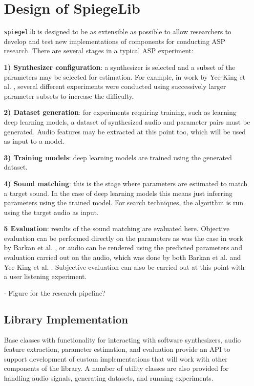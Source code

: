  
\section{Design of SpiegeLib}
\label{chapter:inverse_synth;section:spiegelib}

\texttt{spiegelib} is designed to be as extensible as possible to allow researchers to develop and test new implementations of components for conducting ASP research. There are several stages in a typical ASP experiment:

\textbf{1) Synthesizer configuration}: a synthesizer is selected and a subset of the parameters may be selected for estimation. For example, in work by Yee-King et al. \cite{yee2018automatic}, several different experiments were conducted using successively larger parameter subsets to increase the difficulty.

\textbf{2) Dataset generation}: for experiments requiring training, such as learning deep learning models, a dataset of synthesized audio and parameter pairs must be generated. Audio features may be extracted at this point too, which will be used as input to a model.

\textbf{3) Training models}: deep learning models are trained using the generated dataset.

\textbf{4) Sound matching}: this is the stage where parameters are estimated to match a target sound. In the case of deep learning models this means just inferring parameters using the trained model. For search techniques, the algorithm is run using the target audio as input.

\textbf{5 Evaluation}: results of the sound matching are evaluated here. Objective evaluation can be performed directly on the parameters as was the case in work by Barkan et al. \cite{barkan2019inversynth},  or audio can be rendered using the predicted parameters and evaluation carried out on the audio, which was done by both Barkan et al. and Yee-King et al. \cite{yee2018automatic}. Subjective evaluation can also be carried out at this point with a user listening experiment.

- Figure for the research pipeline?

\subsection{Library Implementation}

Base classes with functionality for interacting with software synthesizers, audio feature extraction, parameter estimation, and evaluation provide an API to support development of custom implementations that will work with other components of the library. A number of utility classes are also provided for handling audio signals, generating datasets, and running experiments.

